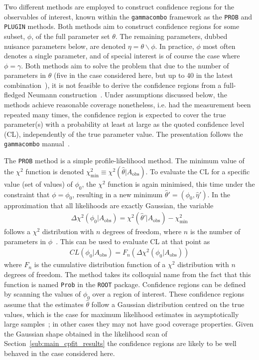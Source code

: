 Two different methods are employed to construct confidence regions for the observables of interest, known within the \texttt{gammacombo} framework as the \texttt{PROB} and \texttt{PLUGIN} methods. Both methods aim to construct confidence regions for some subset, $\phi$, of the full parameter set $\theta$. The remaining parameters, dubbed nuisance parameters below, are denoted $\eta = \theta \backslash \phi$. In practice, $\phi$ most often denotes a single parameter, and of special interest is of course the case where $\phi = \gamma$. Both methods aim to solve the problem that due to the number of parameters in $\theta$ (five in the case considered here, but up to 40 in the latest \lhcb combination~\cite{LHCb-CONF-2018-002}), it is not feasible to derive the confidence regions from a full-fledged Neumann construction~\cite{neumannOutlineTheoryStatistical1937}. Under assumptions discussed below, the methods achieve reasonable coverage nonetheless, i.e. had the measurement been repeated many times, the confidence region is expected to cover the true parameter(s) with a probability at least at large as the quoted confidence level (CL), independently of the true parameter value. The presentation follows the \texttt{gammacombo} manual~\cite{gammacombo}. 

The \texttt{PROB} method is a simple profile-likelihood method. The minimum value of the $\chi^2$ function is denoted $\chi^2_\mathrm{min}\equiv\chi^2(\hat \theta|A_\mathrm{obs})$.  To evaluate the CL for a specific value (set of values) of $\phi_0$, the $\chi^2$ function is again minimised, this time under the constraint that $\phi=\phi_0$, resulting in a new minimum $\hat \theta' = (\phi_0, \hat \eta')$. In the approximation that all likelihoods are exactly Gaussian, the variable
\begin{align}
    \Delta \chi^2(\phi_0|A_\mathrm{obs}) = \chi^2(\hat \theta '|A_\mathrm{obs}) - \chi^2_\mathrm{min}
\end{align}
follows a $\chi^2$ distribution with $n$ degrees of freedom, where $n$ is the number of parameters in $\phi$~\cite{PDG2020}. This can be used to evaluate CL at that point as
\begin{align}
    CL(\phi_0|A_\mathrm{obs}) = F_n(\Delta \chi^2(\phi_0|A_\mathrm{obs}))
\end{align}
where $F_n$ is the cumulative distribution function of a $\chi^2$ distribution with $n$ degrees of freedom. The method takes its colloquial name from the fact that this function is named \texttt{Prob} in the \texttt{ROOT} package. Confidence regions can be defined by scanning the values of $\phi_0$ over a region of interest. These confidence regions assume that the estimates $\hat \theta$ follow a Gaussian distribution centred on the true values, which is  the case for maximum likelihood estimates in asymptotically large samples~\cite{lehmannElementsLargeSampleTheory1998}; in other cases they may not have good coverage properties. Given the Gaussian shape obtained in the likelihood scan of Section~\ref{sub:main_cpfit_results} the confidence regions are likely to be well behaved in the case considered here.

